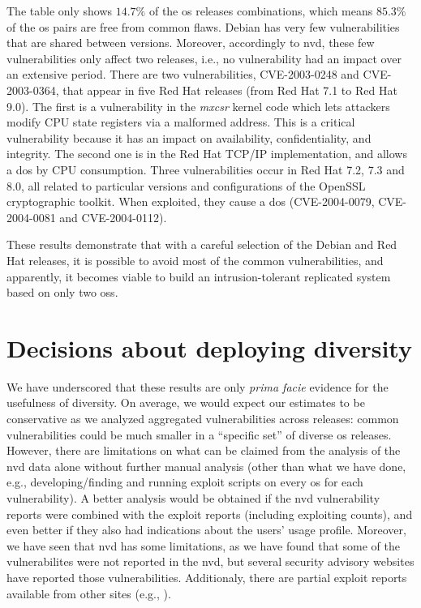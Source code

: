 The table only shows $14.7\%$ of the \gls{os} releases combinations, which means $85.3\%$ of the \gls{os} pairs are free from common flaws. 
Debian has very few vulnerabilities that are shared between versions. 
Moreover, accordingly to \gls{nvd}, these few vulnerabilities only affect two releases, i.e., no vulnerability had an impact over an extensive period. 
There are two vulnerabilities, CVE-2003-0248 and CVE-2003-0364, that appear in five Red Hat releases (from Red Hat 7.1 to Red Hat 9.0). 
The first is a vulnerability in the \emph{mxcsr} kernel code which lets attackers modify CPU state registers via a malformed address. 
This is a critical vulnerability because it has an impact on availability, confidentiality, and integrity. 
The second one is in the Red Hat TCP/IP implementation, and allows a \gls{dos} by CPU consumption. 
Three vulnerabilities occur in Red Hat 7.2, 7.3 and 8.0, all related to particular versions and configurations of the OpenSSL cryptographic toolkit. 
When exploited, they cause a \gls{dos} (CVE-2004-0079, CVE-2004-0081 and CVE-2004-0112).

These results demonstrate that with a careful selection of the Debian and Red Hat releases, it is possible to avoid most of the common vulnerabilities, and apparently, it becomes viable to build an intrusion-tolerant replicated system based on only two \glspl{os}.


\section{Decisions about deploying diversity}\label{decisions}
We have underscored that these results are only \textit{prima facie} evidence for the usefulness of diversity. 
On average, we would expect our estimates to be conservative as we analyzed aggregated vulnerabilities across releases: common vulnerabilities could be much smaller in a ``specific set'' of diverse \gls{os} releases. 
However, there are limitations on what can be claimed from the analysis of the \gls{nvd} data alone without further manual analysis (other than what we have done, e.g., developing/finding and running exploit scripts on every \gls{os} for each vulnerability).
A better analysis would be obtained if the \gls{nvd} vulnerability reports were combined with the exploit reports (including exploiting counts), and even better if they also had indications about the users' usage profile.
Moreover, we have seen that \gls{nvd} has some limitations, as we have found that some of the vulnerabilites were not reported in the \gls{nvd}, but several security advisory websites have reported those vulnerabilities.
Additionaly, there are partial exploit reports available from other sites (e.g., \cite{cvedetails}).


